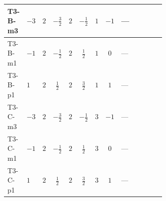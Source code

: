 \documentclass[8pt]{article}
\begin{document}
\begin{landscape}
\begin{longtable}{@{}llcccccc >{\raggedright\arraybackslash}p{0.21\linewidth} >{\raggedright\arraybackslash}p{0.21\linewidth} >{\raggedright\arraybackslash}p{0.21\linewidth}@{}}
\midrule
T3-B-m3 & $-3$ & $2$ & $-\frac{3}{2}$ & $2$ & $-\frac{1}{2}$ & $1$ & $-1$ & --- & \scriptsize\adjustbox{max width=\linewidth}{$\begin{gathered} +4 {\lambda_{12}^{(1)}}^2\end{gathered}$} & \scriptsize\adjustbox{max width=\linewidth}{$\begin{gathered} +4 {\lambda_{HS_2}^{(1)}}^2\end{gathered}$} \\
\midrule
T3-B-m1 & $-1$ & $2$ & $-\frac{1}{2}$ & $2$ & $\frac{1}{2}$ & $1$ & $0$ & --- & \scriptsize\adjustbox{max width=\linewidth}{$\begin{gathered} +4 {\lambda_{12}^{(1)}}^2\end{gathered}$} & \scriptsize\adjustbox{max width=\linewidth}{$\begin{gathered} +4 {\lambda_{HS_2}^{(1)}}^2\end{gathered}$} \\
\midrule
T3-B-p1 & $1$ & $2$ & $\frac{1}{2}$ & $2$ & $\frac{3}{2}$ & $1$ & $1$ & --- & \scriptsize\adjustbox{max width=\linewidth}{$\begin{gathered} +4 {\lambda_{12}^{(1)}}^2\end{gathered}$} & \scriptsize\adjustbox{max width=\linewidth}{$\begin{gathered} +4 {\lambda_{HS_2}^{(1)}}^2\end{gathered}$} \\
\midrule
T3-C-m3 & $-3$ & $2$ & $-\frac{3}{2}$ & $2$ & $-\frac{1}{2}$ & $3$ & $-1$ & --- & \scriptsize\adjustbox{max width=\linewidth}{$\begin{gathered} +4 {\lambda_{12}^{(1)}}^2\end{gathered}$} & \scriptsize\adjustbox{max width=\linewidth}{$\begin{gathered} +4 {\lambda_{HS_2}^{(1)}}^2\end{gathered}$} \\
\midrule
T3-C-m1 & $-1$ & $2$ & $-\frac{1}{2}$ & $2$ & $\frac{1}{2}$ & $3$ & $0$ & --- & \scriptsize\adjustbox{max width=\linewidth}{$\begin{gathered} +4 {\lambda_{12}^{(1)}}^2\end{gathered}$} & \scriptsize\adjustbox{max width=\linewidth}{$\begin{gathered} +4 {\lambda_{HS_2}^{(1)}}^2\end{gathered}$} \\
\midrule
T3-C-p1 & $1$ & $2$ & $\frac{1}{2}$ & $2$ & $\frac{3}{2}$ & $3$ & $1$ & --- & \scriptsize\adjustbox{max width=\linewidth}{$\begin{gathered} +4 {\lambda_{12}^{(1)}}^2\end{gathered}$} & \scriptsize\adjustbox{max width=\linewidth}{$\begin{gathered} +4 {\lambda_{HS_2}^{(1)}}^2\end{gathered}$} \\

\end{longtable}
\end{landscape}
\end{document}
